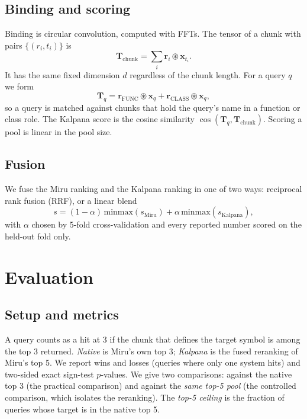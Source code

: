 \documentclass[11pt, a4paper]{article}
\begin{document}
\subsection{Binding and scoring}
Binding is circular convolution, computed with FFTs. The tensor of a chunk with pairs $\{(r_i, t_i)\}$ is
\begin{equation}
\mathbf{T}_{\text{chunk}} = \sum_i \mathbf{r}_i \circledast \mathbf{x}_{t_i}.
\end{equation}
It has the same fixed dimension $d$ regardless of the chunk length. For a query $q$ we form
\begin{equation}
\mathbf{T}_{q} = \mathbf{r}_{\text{FUNC}} \circledast \mathbf{x}_q + \mathbf{r}_{\text{CLASS}} \circledast \mathbf{x}_q,
\end{equation}
so a query is matched against chunks that hold the query's name in a function or class role. The Kalpana score is the cosine similarity $\cos(\mathbf{T}_q, \mathbf{T}_{\text{chunk}})$. Scoring a pool is linear in the pool size.

\subsection{Fusion}
We fuse the Miru ranking and the Kalpana ranking in one of two ways: reciprocal rank fusion (RRF), or a linear blend
\begin{equation}
s = (1-\alpha)\,\mathrm{minmax}(s_{\text{Miru}}) + \alpha\,\mathrm{minmax}(s_{\text{Kalpana}}),
\end{equation}
with $\alpha$ chosen by 5-fold cross-validation and every reported number scored on the held-out fold only.

\section{Evaluation}
\subsection{Setup and metrics}
A query counts as a hit at 3 if the chunk that defines the target symbol is among the top 3 returned. \emph{Native} is Miru's own top 3; \emph{Kalpana} is the fused reranking of Miru's top 5. We report wins and losses (queries where only one system hits) and two-sided exact sign-test $p$-values. We give two comparisons: against the native top 3 (the practical comparison) and against the \emph{same top-5 pool} (the controlled comparison, which isolates the reranking). The \emph{top-5 ceiling} is the fraction of queries whose target is in the native top 5.
\end{document}

